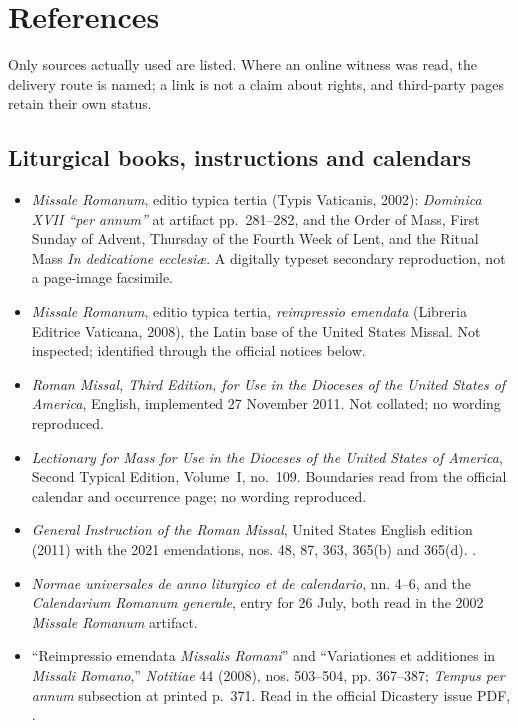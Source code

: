 \section*{References}

Only sources actually used are listed. Where an online witness was read, the delivery route is named; a link is not a claim about rights, and third-party pages retain their own status.

\subsection*{Liturgical books, instructions and calendars}

\begin{itemize}
\item \emph{Missale Romanum}, editio typica tertia (Typis Vaticanis, 2002): \emph{Dominica XVII ``per annum''} at artifact pp.~281--282, and the Order of Mass, First Sunday of Advent, Thursday of the Fourth Week of Lent, and the Ritual Mass \emph{In dedicatione ecclesi\ae}. A digitally typeset secondary reproduction, not a page-image facsimile.
\item \emph{Missale Romanum}, editio typica tertia, \emph{reimpressio emendata} (Libreria Editrice Vaticana, 2008), the Latin base of the United States Missal. Not inspected; identified through the official notices below.
\item \emph{Roman Missal, Third Edition, for Use in the Dioceses of the United States of America}, English, implemented 27 November 2011. Not collated; no wording reproduced.
\item \emph{Lectionary for Mass for Use in the Dioceses of the United States of America}, Second Typical Edition, Volume~I, no.~109. Boundaries read from the official calendar and occurrence page; no wording reproduced.
\item \emph{General Instruction of the Roman Missal}, United States English edition (2011) with the 2021 emendations, nos. 48, 87, 363, 365(b) and 365(d). .
\item \emph{Normae universales de anno liturgico et de calendario}, nn. 4--6, and the \emph{Calendarium Romanum generale}, entry for 26 July, both read in the 2002 \emph{Missale Romanum} artifact.
\item ``Reimpressio emendata \emph{Missalis Romani}'' and ``Variationes et additiones in \emph{Missali Romano},'' \emph{Notitiae} 44 (2008), nos. 503--504, pp. 367--387; \emph{Tempus per annum} subsection at printed p.~371. Read in the official Dicastery issue PDF, .

\end{itemize}
